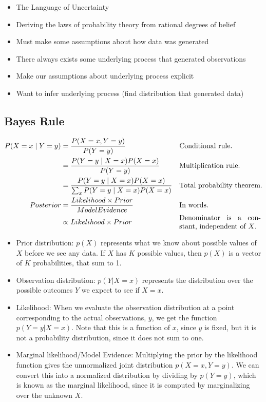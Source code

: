 \documentclass{article}
\newcommand{\given}{\mid}
\begin{document}
\begin{itemize}
    \item The Language of Uncertainty
    \item Deriving the laws of probability theory from rational degrees of belief
    \item Must make some assumptions about how data was generated
    \item There always exists some underlying process that generated observations
    \item Make our assumptions about underlying process explicit
    \item Want to infer underlying process (find distribution that generated data)
\end{itemize}

\subsection{Bayes Rule}

\begin{align*}
    P(X=x \given Y=y) 
    &= \frac{P(X=x,Y=y)}{P(Y=y)} && \text{Conditional rule.} \\
    &= \frac{P(Y=y \given X=x) P(X=x)}{P(Y=y)} && \text{Multiplication rule.} \\
    &= \frac{P(Y=y \given X=x) P(X=x)}{\sum_x P(Y=y \given X=x) P(X=x)} && \text{Total probability theorem.} \\
    Posterior  &= \frac{Likelihood \times Prior}{Model Evidence} && \text{In words.} \\
    &\propto Likelihood \times Prior && \parbox{4cm}{Denominator is a constant, independent of $X$.}
\end{align*}

\begin{itemize}
    \item Prior distribution: $p(X)$ represents what we know about possible values of $X$ before we see any data.
          If $X$ has $K$ possible values, then $p(X)$ is a vector of $K$ probabilities, that sum to 1.
    \item Observation distribution: $p(Y|X=x)$ represents the distribution over the possible outcomes $Y$ we expect to see if $X=x$.
    \item Likelihood: When we evaluate the observation distribution at a point corresponding to the actual observations, $y$, we get the function $p(Y=y|X=x)$.
          Note that this is a function of $x$, since $y$ is fixed, but it is not a probability distribution, since it does not sum to one.
    \item Marginal likelihood/Model Evidence: Multiplying the prior by the likelihood function gives the unnormalized joint distribution $p(X=x,Y=y)$. 
          We can convert this into a normalized distribution by dividing by $p(Y=y)$, which is known as the marginal likelihood, since it is computed by marginalizing over the unknown $X$.
\end{itemize}
\end{document}
